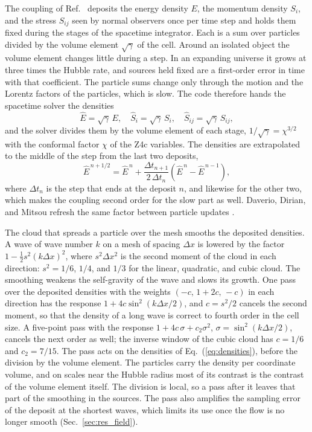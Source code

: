 \documentclass[aps,prd,twocolumn,10pt,superscriptaddress,nofootinbib,longbibliography,floatfix]{revtex4-2}
\begin{document}
The coupling of Ref.~\cite{Wu:2026nrpic} deposits the energy density $E$, the momentum density $S_i$, and the stress $S_{ij}$ seen by normal observers once per time step and holds them fixed during the stages of the spacetime integrator. Each is a sum over particles divided by the volume element $\sqrt{\gamma}$ of the cell. Around an isolated object the volume element changes little during a step. In an expanding universe it grows at three times the Hubble rate, and sources held fixed are a first-order error in time with that coefficient. The particle sums change only through the motion and the Lorentz factors of the particles, which is slow. The code therefore hands the spacetime solver the densities
\begin{equation}\label{eq:densities}
\hat E = \sqrt{\gamma}\,E, \quad \hat S_i = \sqrt{\gamma}\,S_i, \quad \hat S_{ij} = \sqrt{\gamma}\,S_{ij},
\end{equation}
and the solver divides them by the volume element of each stage, $1/\sqrt{\gamma} = \chi^{3/2}$ with the conformal factor $\chi$ of the Z4c variables. The densities are extrapolated to the middle of the step from the last two deposits,
\begin{equation}
\hat E^{\,n+1/2} = \hat E^{\,n} + \frac{\Delta t_{n+1}}{2\,\Delta t_{n}}\left(\hat E^{\,n} - \hat E^{\,n-1}\right),
\end{equation}
where $\Delta t_n$ is the step that ends at the deposit $n$, and likewise for the other two, which makes the coupling second order for the slow part as well. Daverio, Dirian, and Mitsou refresh the same factor between particle updates \cite{Daverio:2019gql}.

The cloud that spreads a particle over the mesh smooths the deposited densities. A wave of wave number $k$ on a mesh of spacing $\Delta x$ is lowered by the factor $1 - \tfrac{1}{2}s^2(k\Delta x)^2$, where $s^2\Delta x^2$ is the second moment of the cloud in each direction: $s^2 = 1/6$, $1/4$, and $1/3$ for the linear, quadratic, and cubic cloud. The smoothing weakens the self-gravity of the wave and slows its growth. One pass over the deposited densities with the weights $(-c,\,1+2c,\,-c)$ in each direction has the response $1 + 4c\sin^2(k\Delta x/2)$, and $c = s^2/2$ cancels the second moment, so that the density of a long wave is correct to fourth order in the cell size. A five-point pass with the response $1 + 4c\,\sigma + c_2\sigma^2$, $\sigma = \sin^2(k\Delta x/2)$, cancels the next order as well; the inverse window of the cubic cloud has $c = 1/6$ and $c_2 = 7/15$. The pass acts on the densities of Eq.~(\ref{eq:densities}), before the division by the volume element. The particles carry the density per coordinate volume, and on scales near the Hubble radius most of its contrast is the contrast of the volume element itself. The division is local, so a pass after it leaves that part of the smoothing in the sources. The pass also amplifies the sampling error of the deposit at the shortest waves, which limits its use once the flow is no longer smooth (Sec.~\ref{sec:res_field}).
\end{document}
